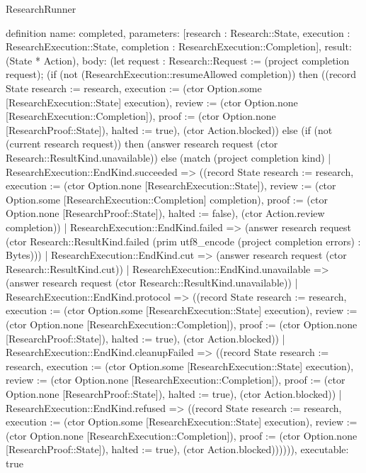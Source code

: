 \begin{lexlean}{ResearchRunner}
\begin{semanticmodule}
definition{
  name: completed,
  parameters: [research : Research::State, execution : ResearchExecution::State, completion : ResearchExecution::Completion],
  result: (State * Action),
  body: (let request : Research::Request := (project completion request); (if (not (ResearchExecution::resumeAllowed completion)) then ((record State {research := research, execution := (ctor Option.some [ResearchExecution::State] execution), review := (ctor Option.none [ResearchExecution::Completion]), proof := (ctor Option.none [ResearchProof::State]), halted := true}), (ctor Action.blocked)) else (if (not (current research request)) then (answer research request (ctor Research::ResultKind.unavailable)) else (match (project completion kind)
    | ResearchExecution::EndKind.succeeded => ((record State {research := research, execution := (ctor Option.none [ResearchExecution::State]), review := (ctor Option.some [ResearchExecution::Completion] completion), proof := (ctor Option.none [ResearchProof::State]), halted := false}), (ctor Action.review completion))
    | ResearchExecution::EndKind.failed => (answer research request (ctor Research::ResultKind.failed (prim utf8_encode (project completion errors) : Bytes)))
    | ResearchExecution::EndKind.cut => (answer research request (ctor Research::ResultKind.cut))
    | ResearchExecution::EndKind.unavailable => (answer research request (ctor Research::ResultKind.unavailable))
    | ResearchExecution::EndKind.protocol => ((record State {research := research, execution := (ctor Option.some [ResearchExecution::State] execution), review := (ctor Option.none [ResearchExecution::Completion]), proof := (ctor Option.none [ResearchProof::State]), halted := true}), (ctor Action.blocked))
    | ResearchExecution::EndKind.cleanupFailed => ((record State {research := research, execution := (ctor Option.some [ResearchExecution::State] execution), review := (ctor Option.none [ResearchExecution::Completion]), proof := (ctor Option.none [ResearchProof::State]), halted := true}), (ctor Action.blocked))
    | ResearchExecution::EndKind.refused => ((record State {research := research, execution := (ctor Option.some [ResearchExecution::State] execution), review := (ctor Option.none [ResearchExecution::Completion]), proof := (ctor Option.none [ResearchProof::State]), halted := true}), (ctor Action.blocked)))))),
  executable: true
}


\end{semanticmodule}
\end{lexlean}
